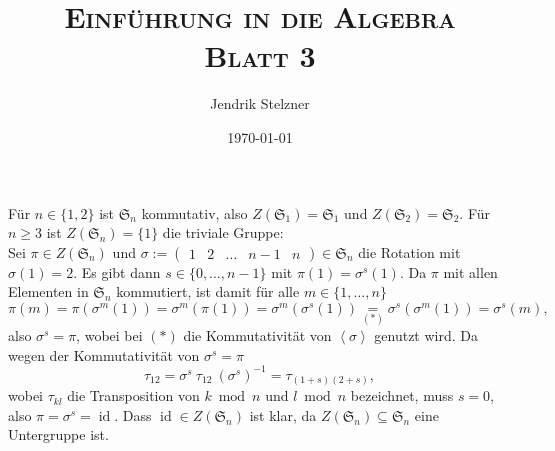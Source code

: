 \documentclass[a4paper,10pt]{article}
\title{\textsc{Einführung in die Algebra \\ \Large Blatt 3}}
\author{Jendrik Stelzner}
\date{\today}
\theoremstyle{definition}
\newcommand{\Sn}{\mathfrak{S}}
\newcommand{\id}{\operatorname{id}}
\newcommand{\vect}[1]{\begin{pmatrix}#1\end{pmatrix}}
\newcommand{\gen}[1]{\left\langle#1\right\rangle}
\begin{document}
\maketitle





\section{}
Für $n \in \{1,2\}$ ist $\Sn_n$ kommutativ, also $Z(\Sn_1) = \Sn_1$ und $Z(\Sn_2) = \Sn_2$. Für $n \geq 3$ ist $Z(\Sn_n) = \{1\}$ die triviale Gruppe:\\
Sei $\pi \in Z(\Sn_n)$ und $\sigma := \vect{1&2&\ldots&n-1&n} \in \Sn_n$ die Rotation mit $\sigma(1)=2$. Es gibt dann $s \in \{0,\ldots,n-1\}$ mit $\pi(1) = \sigma^s(1)$. Da $\pi$ mit allen Elementen in $\Sn_n$ kommutiert, ist damit für alle $m \in \{1,\ldots,n\}$
\[
 \pi(m)
 = \pi(\sigma^m(1))
 = \sigma^m(\pi(1))
 = \sigma^m(\sigma^s(1))
 \underset{(*)}{=} \sigma^s(\sigma^m(1))
 = \sigma^s(m),
\]
also $\sigma^s = \pi$, wobei bei $(*)$ die Kommutativität von $\gen{\sigma}$ genutzt wird. Da wegen der Kommutativität von $\sigma^s = \pi$
\[
 \tau_{12} = \sigma^s\ \tau_{12}\ (\sigma^s)^{-1} = \tau_{(1+s)(2+s)},
\]
wobei $\tau_{kl}$ die Transposition von $k \bmod n$ und $l \bmod n$ bezeichnet, muss $s = 0$, also $\pi = \sigma^s = \id$. Dass $\id \in Z(\Sn_n)$ ist klar, da $Z(\Sn_n) \subseteq \Sn_n$ eine Untergruppe ist.
\end{document}
